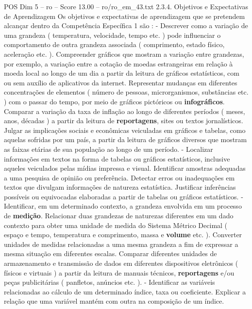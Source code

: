 \begin{textsample}{POS Dim 5 – ro – Score 13.00 – ro/ro\_em\_43.txt}  \label{ex:f5_pos_113}
2.3.4.
Objetivos e Expectativas de Aprendizagem Os objetivos e expectativas de aprendizagem que se pretendem alcançar dentro da Competência Específica 1 são : - Descrever como a variação de uma grandeza ( temperatura, velocidade, tempo etc. ) pode influenciar o comportamento de outra grandeza associada ( comprimento, estado físico, aceleração etc. ).
Compreender gráficos que mostram a variação entre grandezas, por exemplo, a variação entre a cotação de moedas estrangeiras em relação à moeda local ao longo de um dia a partir da leitura de gráficos estatísticos, com ou sem auxílio de aplicativos da internet.
Representar mudanças em diferentes concentrações de elementos ( número de pessoas, microrganismos, substâncias etc. ) com o passar do tempo, por meio de gráficos pictóricos ou \textbf{infográficos}.
Comparar a variação da taxa de inflação ao longo de diferentes períodos ( meses, anos, décadas ) a partir da leitura de \textbf{reportagens}, sites ou textos jornalísticos.
Julgar as implicações sociais e econômicas veiculadas em gráficos e tabelas, como aquelas sofridas por um país, a partir da leitura de gráficos diversos que mostram as faixas etárias de sua população ao longo de um período. - Localizar informações em textos na forma de tabelas ou gráficos estatísticos, inclusive aqueles veiculados pelas mídias impressa e visual.
Identificar amostras adequadas a uma pesquisa de opinião ou preferência.
Detectar erros ou inadequações em textos que divulgam informações de natureza estatística.
Justificar inferências possíveis ou equivocadas elaboradas a partir de tabelas ou gráficos estatísticos. - Identificar, em um determinado contexto, a grandeza envolvida em um processo de \textbf{medição}.
Relacionar duas grandezas de naturezas diferentes em um dado contexto para obter uma unidade de medida do Sistema Métrico Decimal ( espaço e tempo, temperatura e comprimento, massa e \textbf{volume} etc. ).
Converter unidades de medidas relacionadas a uma mesma grandeza a fim de expressar a mesma situação em diferentes escalas.
Comparar diferentes unidades de armazenamento e transmissão de dados em diferentes dispositivos eletrônicos ( físicos e virtuais ) a partir da leitura de manuais técnicos, \textbf{reportagens} e/ou peças publicitárias ( panfletos, anúncios etc. ). - Identificar as variáveis relacionadas ao cálculo de um determinado índice, taxa ou coeficiente.
Explicar a relação que uma variável mantém com outra na composição de um índice.

\end{textsample}
